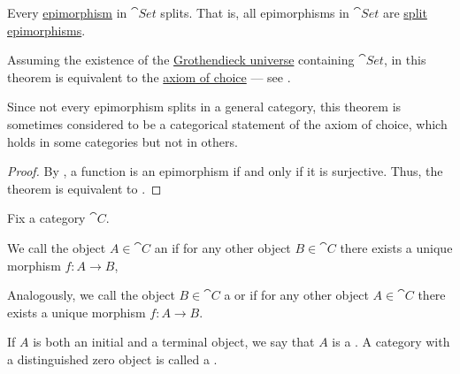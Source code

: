 \begin{theorem}\label{thm:epimorphisms_split_in_set}
  Every \hyperref[def:morphism_invertibility/right_cancellative]{epimorphism} in \hyperref[def:category_of_small_sets]{\( \cat{Set} \)} splits. That is, all epimorphisms in \( \cat{Set} \) are \hyperref[def:morphism_invertibility/right_invertible]{split epimorphisms}.

  Assuming the existence of the \hyperref[def:grothendieck_universe]{Grothendieck universe} containing \( \cat{Set} \), in \hyperref[def:zfc]{} this theorem is equivalent to the \hyperref[def:zfc/choice]{axiom of choice} --- see .

  Since not every epimorphism splits in a general category, this theorem is sometimes considered to be a categorical statement of the axiom of choice, which holds in some categories but not in others.
\end{theorem}
\begin{proof}
  By , a function is an epimorphism if and only if it is surjective. Thus, the theorem is equivalent to .
\end{proof}

\begin{definition}\label{def:zero_objects}
  Fix a category \( \cat{C} \).

  \begin{thmenum}
     We call the object \( A \in \cat{C} \) an  if for any other object \( B \in \cat{C} \) there exists a unique morphism \( f: A \to B \),

     Analogously, we call the object \( B \in \cat{C} \) a  or  if for any other object \( A \in \cat{C} \) there exists a unique morphism \( f: A \to B \).

     If \( A \) is both an initial and a terminal object, we say that \( A \) is a . A category with a distinguished zero object is called a .
  \end{thmenum}
\end{definition}

